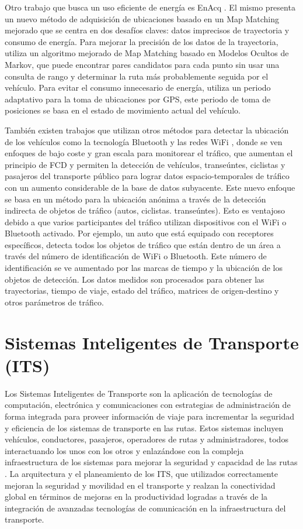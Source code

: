 Otro trabajo que busca un uso eficiente de energía es EnAcq \cite{fang2011enacq}. El mismo presenta un nuevo método de adquisición de ubicaciones basado en un Map Matching mejorado que se centra en dos desafíos claves: datos imprecisos de trayectoria y consumo de energía. Para mejorar la precisión de los datos de la trayectoria, utiliza un algoritmo mejorado de Map Matching basado en Modelos Ocultos de Markov, que puede encontrar pares candidatos para cada punto sin usar una consulta de rango y determinar la ruta más probablemente seguida por el vehículo. Para evitar el consumo innecesario de energía, utiliza un periodo adaptativo para la toma de ubicaciones por GPS, este periodo de toma de posiciones se basa en el estado de movimiento actual del vehículo.

También existen trabajos que utilizan otros métodos para detectar la ubicación de los vehículos como la tecnología Bluetooth y las redes WiFi \cite{ruppe2012augmenting}, donde se ven enfoques de bajo coste y gran escala para monitorear el tráfico, que aumentan el principio de FCD y permiten la detección de vehículos, transeúntes, ciclistas y pasajeros del transporte público para lograr datos espacio-temporales de tráfico con un aumento considerable de la base de datos subyacente. Este nuevo enfoque se basa en un método para la ubicación anónima a través de la detección indirecta de objetos de tráfico (autos, ciclistas. transeúntes). Esto es ventajoso debido a que varios participantes del tráfico utilizan dispositivos con el WiFi o Bluetooth activado. Por ejemplo, un auto que está equipado con receptores específicos, detecta todos los objetos de tráfico que están dentro de un área a través del número de identificación de WiFi o Bluetooth. Este número de identificación se ve aumentado por las marcas de tiempo y la ubicación de los objetos de detección. Los datos medidos son procesados para obtener las trayectorias, tiempo de viaje, estado del tráfico, matrices de origen-destino y otros parámetros de tráfico.

\section{Sistemas Inteligentes de Transporte (ITS)}

Los Sistemas Inteligentes de Transporte son la aplicación de tecnologías de computación, electrónica y comunicaciones con estrategias de administración de forma integrada para proveer información de viaje para incrementar la seguridad y eficiencia de los sistemas de transporte en las rutas. Estos sistemas incluyen vehículos, conductores, pasajeros, operadores de rutas y administradores, todos interactuando los unos con los otros y enlazándose con la compleja infraestructura de los sistemas para mejorar la seguridad y capacidad de las rutas \cite{chowdhury2003fundamentals}. La arquitectura y el planeamiento de los ITS, que utilizados correctamente mejoran la seguridad y movilidad en el transporte y realzan la conectividad global en términos de mejoras en la productividad logradas a través de la integración de avanzadas tecnologías de comunicación en la infraestructura del transporte.

